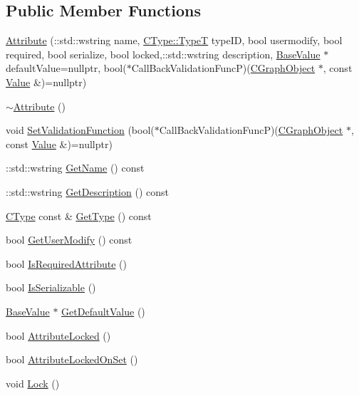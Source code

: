 \subsection*{Public Member Functions}
\begin{DoxyCompactItemize}
\item 
\hyperlink{class_attribute_a37f1e806f6804ec9c2c48ec61186260a}{Attribute} (\+::std\+::wstring name, \hyperlink{class_c_type_accfff8ca293dba5cbd8a2d677cf6afa8}{C\+Type\+::\+Type\+T} type\+I\+D, bool usermodify, bool required, bool serialize, bool locked,\+::std\+::wstring description, \hyperlink{class_base_value}{Base\+Value} $\ast$default\+Value=nullptr, bool($\ast$Call\+Back\+Validation\+Func\+P)(\hyperlink{class_c_graph_object}{C\+Graph\+Object} $\ast$, const \hyperlink{class_value}{Value} \&)=nullptr)
\item 
\hyperlink{class_attribute_a28ab087bb886728670e4ae5791bc2ea8}{$\sim$\+Attribute} ()
\item 
void \hyperlink{class_attribute_a7817adff7dd4f9ee46ef3d27c017e677}{Set\+Validation\+Function} (bool($\ast$Call\+Back\+Validation\+Func\+P)(\hyperlink{class_c_graph_object}{C\+Graph\+Object} $\ast$, const \hyperlink{class_value}{Value} \&)=nullptr)
\item 
\+::std\+::wstring \hyperlink{class_attribute_a64451f5f4deb0967de36078d8294fda2}{Get\+Name} () const 
\item 
\+::std\+::wstring \hyperlink{class_attribute_a86b052f0e8957043c25d49cd94b0c0a7}{Get\+Description} () const 
\item 
\hyperlink{class_c_type}{C\+Type} const \& \hyperlink{class_attribute_acd792c67478766d9808988b676b538a1}{Get\+Type} () const 
\item 
bool \hyperlink{class_attribute_ad7274fdc612fafe20f97f388254df6c2}{Get\+User\+Modify} () const 
\item 
bool \hyperlink{class_attribute_ab212f1bde0a7fcf77582d9ac2f3c3528}{Is\+Required\+Attribute} ()
\item 
bool \hyperlink{class_attribute_a5067d7cd8b7415c873652298f6bb90c1}{Is\+Serializable} ()
\item 
\hyperlink{class_base_value}{Base\+Value} $\ast$ \hyperlink{class_attribute_a6dc6af2f97c6a278ba15c9613c8725c3}{Get\+Default\+Value} ()
\item 
bool \hyperlink{class_attribute_a33815679807073ff9cc9cd045c55049f}{Attribute\+Locked} ()
\item 
bool \hyperlink{class_attribute_a7412cdd12d31aa0fc2058e2a31c7514b}{Attribute\+Locked\+On\+Set} ()
\item 
void \hyperlink{class_attribute_af0d06b0502e8e87a9664f0b189c875d4}{Lock} ()
\end{DoxyCompactItemize}
